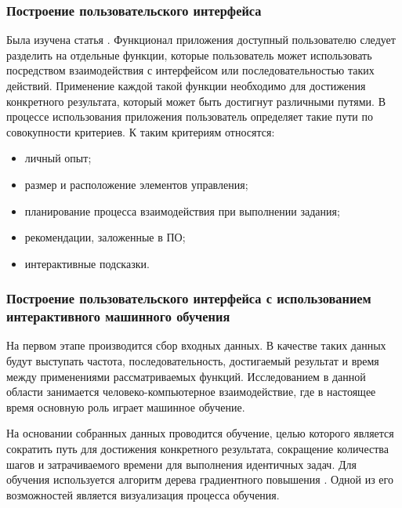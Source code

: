 \def\notedate{2022.10.13}
\def\currentauthor{Василян А.Р. (РК6-73Б)}

\subsubsection{Построение пользовательского интерфейса}

Была изучена статья \cite{Yurkin2020}. Функционал приложения доступный пользователю следует разделить на отдельные функции, которые пользователь может использовать посредством взаимодействия с интерфейсом или последовательностью таких действий. Применение каждой такой функции необходимо для достижения конкретного результата, который может быть достигнут различными путями. В процессе использования приложения пользователь определяет такие пути по совокупности критериев. К таким критериям относятся:
\begin{itemize}
	\item личный опыт; 
	\item размер и расположение элементов управления;
	\item планирование процесса взаимодействия при выполнении задания;
	\item рекомендации, заложенные в ПО; 
	\item интерактивные подсказки.
\end{itemize}

\subsubsection{Построение пользовательского интерфейса с использованием интерактивного машинного обучения}

На первом этапе производится сбор входных данных. В качестве таких данных будут выступать частота, последовательность, достигаемый результат и время между применениями рассматриваемых функций. Исследованием в данной области занимается человеко-компьютерное взаимодействие, где в настоящее время основную роль играет машинное обучение.

На основании собранных данных проводится обучение, целью которого является сократить путь для достижения конкретного результата, сокращение количества шагов и затрачиваемого времени для выполнения идентичных задач. Для обучения используется алгоритм дерева градиентного повышения \cite{Gradient_boosting}. Одной из его возможностей является визуализация процесса обучения.


